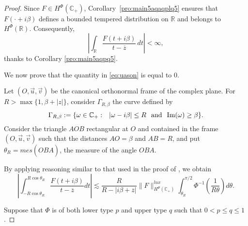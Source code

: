 \documentclass[a4paper,12pt,intlimits,oneside]{amsart}
\theoremstyle{definition}
\numberwithin{equation}{section}
\theoremstyle{definition}
\begin{document}
 
 
 
\begin{proof}
Since $F\in H^{\Phi}(\mathbb{C}_{+})$, Corollary~\ref{pro:main5aqaqplq5} ensures that 
$F(\cdot+i\beta)$ defines a bounded tempered distribution on $\mathbb{R}$ and belongs to $H^{\Phi}(\mathbb{R})$.
Consequently,
\begin{equation}\label{eq:uason}
\left|\int_{\mathbb{R}}\frac{F(t+i\beta)}{t-\overline{z}}\,dt\right|<\infty,
\end{equation}
thanks to Corollary \ref{pro:main5aqpq5}. 

\medskip

We now prove that the quantity in \eqref{eq:uason} is equal to $0$.

Let $(O,\overrightarrow{u},\overrightarrow{v})$ be the canonical orthonormal frame of the complex plane. 
For $R > \max\{1, \beta+|z|\}$, consider $\Gamma_{R,\beta}$ the curve defined by 
 $$ \Gamma_{R,\beta}:=\{ \omega \in \mathbb{C}_{+}:\hspace*{0.25cm} |\omega-i\beta| \leq R \hspace*{0.25cm}\text{and} \hspace*{0.25cm} \mathrm{Im}(\omega) \geq \beta       \}.       $$
Consider the  triangle $AOB$ rectangular at $O$ and contained in the frame  $(O,\overrightarrow{u},\overrightarrow{v})$ such that the distances $AO=\beta$ and $AB=R$, and put $\theta_{R}=mes(\widehat{OBA})$, the measure of the angle $OBA$. 

\medskip

By applying reasoning similar to that used in the proof of  \cite[Lemma 2.7]{djefeuto},  we obtain
$$  \left|\int_{-R\cos \theta_{R}}^{R\cos \theta_{R}}\frac{F(t+i\beta)}{t-\overline{z}}dt \right|
\lesssim \frac{R}{R- |i\beta+\overline{z}|}\|F\|_{H^{\Phi}(\mathbb{C}_{+})}^{lux} \int_{\theta_{R}}^{\pi/2} \Phi^{-1}\left(\frac{1}{ R\theta}\right)d\theta.  $$

\medskip


Suppose that $\Phi$ is of both lower type $p$ and upper type $q$ such that $0<p\leq q \leq 1$. 

\medskip


\end{proof}
\end{document}
